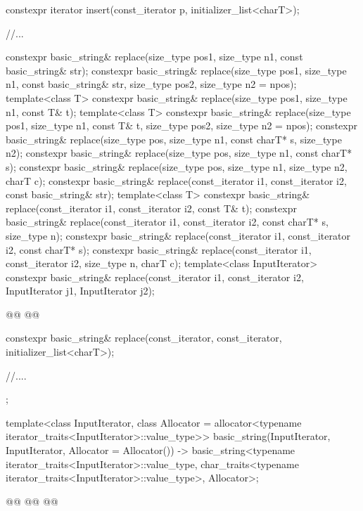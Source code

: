 \documentclass{wg21}
\begin{document}
\begin{codeblock}
{{        constexpr iterator insert(const_iterator p, initializer_list<charT>);

        //...

        constexpr basic_string& replace(size_type pos1, size_type n1, const basic_string& str);
        constexpr basic_string& replace(size_type pos1, size_type n1, const basic_string& str,
        size_type pos2, size_type n2 = npos);
        template<class T>
        constexpr basic_string& replace(size_type pos1, size_type n1, const T& t);
        template<class T>
        constexpr basic_string& replace(size_type pos1, size_type n1, const T& t,
        size_type pos2, size_type n2 = npos);
        constexpr basic_string& replace(size_type pos, size_type n1, const charT* s, size_type n2);
        constexpr basic_string& replace(size_type pos, size_type n1, const charT* s);
        constexpr basic_string& replace(size_type pos, size_type n1, size_type n2, charT c);
        constexpr basic_string& replace(const_iterator i1, const_iterator i2,
        const basic_string& str);
        template<class T>
        constexpr basic_string& replace(const_iterator i1, const_iterator i2, const T& t);
        constexpr basic_string& replace(const_iterator i1, const_iterator i2, const charT* s,
        size_type n);
        constexpr basic_string& replace(const_iterator i1, const_iterator i2, const charT* s);
        constexpr basic_string& replace(const_iterator i1, const_iterator i2, size_type n, charT c);
        template<class InputIterator>
        constexpr basic_string& replace(const_iterator i1, const_iterator i2,
            InputIterator j1, InputIterator j2);

        @@
        @@

        constexpr basic_string& replace(const_iterator, const_iterator, initializer_list<charT>);

        //....
    };

    template<class InputIterator,
    class Allocator = allocator<typename iterator_traits<InputIterator>::value_type>>
    basic_string(InputIterator, InputIterator, Allocator = Allocator())
    -> basic_string<typename iterator_traits<InputIterator>::value_type,
    char_traits<typename iterator_traits<InputIterator>::value_type>,
    Allocator>;


    @@
    @@
    @@

}
\end{codeblock}
\end{document}
